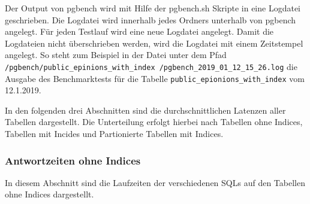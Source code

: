 Der Output von pgbench wird mit Hilfe der pgbench.sh Skripte in eine Logdatei geschrieben. Die Logdatei wird innerhalb jedes Ordners unterhalb von pgbench angelegt.
Für jeden Testlauf wird eine neue Logdatei angelegt. Damit die Logdateien nicht überschrieben werden, wird die Logdatei mit einem Zeitstempel angelegt. So steht zum Beispiel in der Datei unter dem Pfad
 \texttt{/pgbench/public\_epinions\_with\_index /pgbench\_2019\_01\_12\_15\_26.log} die Ausgabe des Benchmarktests für die Tabelle \texttt{public\_epionions\_with\_index} vom 12.1.2019.
 
 In den folgenden drei Abschnitten sind die durchschnittlichen Latenzen aller Tabellen dargestellt. Die Unterteilung erfolgt hierbei nach Tabellen ohne Indices, Tabellen mit Incides und  Partionierte Tabellen mit Indices. 

\newpage
\subsubsection{Antwortzeiten ohne Indices}
In diesem Abschnitt sind die Laufzeiten der verschiedenen SQLs auf den Tabellen ohne Indices dargestellt.
